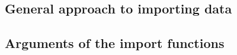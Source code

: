 

\subsection{General approach to importing data}
    

\subsection{Arguments of the import functions}
    